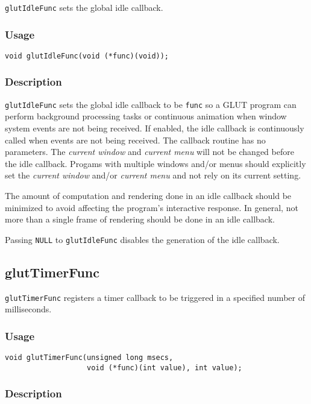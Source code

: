 {\tt glutIdleFunc} sets the global idle callback.

\subsubsection*{Usage}
\begin{verbatim}
void glutIdleFunc(void (*func)(void));
\end{verbatim}

\subsubsection*{Description}

{\tt glutIdleFunc} sets the global idle callback to be {\tt func}
so a GLUT program
can perform background processing tasks or continuous animation when
window system events are not being received.  If enabled, the idle
callback is continuously called when events are not being
received.  The callback routine has no parameters.  The {\em current
window} and {\em current menu} will not be changed before the
idle callback.  Progams with multiple windows and/or menus should
explicitly set the {\em current window} and/or {\em current menu}
and not rely on its current setting.

The amount of computation and rendering done in an idle callback
should be minimized to avoid affecting the program's interactive
response.  In general, not more than a single frame of rendering
should be done in an idle callback.

Passing {\tt NULL} to {\tt glutIdleFunc}
disables the generation of the idle callback.

\subsection{glutTimerFunc}

{\tt glutTimerFunc} registers a timer callback to be triggered
in a specified number of milliseconds.

\subsubsection*{Usage}
\begin{verbatim}
void glutTimerFunc(unsigned long msecs,
                   void (*func)(int value), int value);
\end{verbatim}

\subsubsection*{Description}

